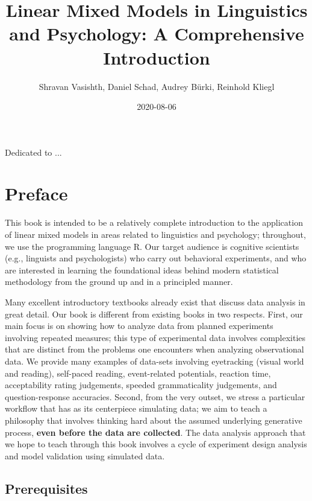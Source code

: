 \documentclass[12pt,]{krantz}
\title{Linear Mixed Models in Linguistics and Psychology: A Comprehensive Introduction}
\author{Shravan Vasishth, Daniel Schad, Audrey Bürki, Reinhold Kliegl}
\date{2020-08-06}
\begin{document}
\maketitle

\thispagestyle{empty}
\begin{center}
Dedicated to ...
\end{center}

\setlength{\abovedisplayskip}{-5pt}
\setlength{\abovedisplayshortskip}{-5pt}

{
\hypersetup{linkcolor=}
\setcounter{tocdepth}{2}
\tableofcontents
}
\hypertarget{preface}{%
\chapter*{Preface}\label{preface}}


This book is intended to be a relatively complete introduction to the application of linear mixed models in areas related to linguistics and psychology; throughout, we use the programming language R. Our target audience is cognitive scientists (e.g., linguists and psychologists) who carry out behavioral experiments, and who are interested in learning the foundational ideas behind modern statistical methodology from the ground up and in a principled manner.

Many excellent introductory textbooks already exist that discuss data analysis in great detail. Our book is different from existing books in two respects. First, our main focus is on showing how to analyze data from planned experiments involving repeated measures; this type of experimental data involves complexities that are distinct from the problems one encounters when analyzing observational data. We provide many examples of data-sets involving eyetracking (visual world and reading), self-paced reading, event-related potentials, reaction time, acceptability rating judgements, speeded grammaticality judgements, and question-response accuracies. Second, from the very outset, we stress a particular workflow that has as its centerpiece simulating data; we aim to teach a philosophy that involves thinking hard about the assumed underlying generative process, \textbf{even before the data are collected}. The data analysis approach that we hope to teach through this book involves a cycle of experiment design analysis and model validation using simulated data.

\hypertarget{prerequisites}{%
\section{Prerequisites}\label{prerequisites}}
\end{document}
